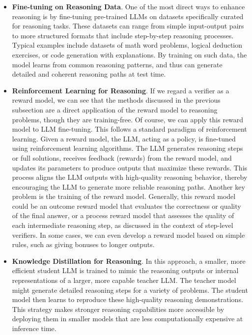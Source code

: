 \begin{itemize}
\item \vspace{0.5em} \textbf{Fine-tuning on Reasoning Data}. One of the most direct ways to enhance reasoning is by fine-tuning pre-trained LLMs on datasets specifically curated for reasoning tasks. These datasets can range from simple input-output pairs to more structured formats that include step-by-step reasoning processes. Typical examples include datasets of math word problems, logical deduction exercises, or code generation with explanations. By training on such data, the model learns from common reasoning patterns, and thus can generate detailed and coherent reasoning paths at test time.
\item \vspace{0.3em} \textbf{Reinforcement Learning for Reasoning}. If we regard a verifier as a reward model, we can see that the methods discussed in the previous subsection are a direct application of the reward model to reasoning problems, though they are training-free. Of course, we can apply this reward model to LLM fine-tuning. This follows a standard paradigm of reinforcement learning. Given a reward model, the LLM, acting as a policy, is fine-tuned using reinforcement learning algorithms. The LLM generates reasoning steps or full solutions, receives feedback (rewards) from the reward model, and updates its parameters to produce outputs that maximize these rewards. This process aligns the LLM outputs with high-quality reasoning behavior, thereby encouraging the LLM to generate more reliable reasoning paths. Another key problem is the training of the reward model. Generally, this reward model could be an outcome reward model that evaluates the correctness or quality of the final answer, or a process reward model that assesses the quality of each intermediate reasoning step, as discussed in the context of step-level verifiers. In some cases, we can even develop a reward model based on simple rules, such as giving bonuses to longer outputs.
\item \vspace{0.3em} \textbf{Knowledge Distillation for Reasoning}. In this approach, a smaller, more efficient student LLM is trained to mimic the reasoning outputs or internal representations of a larger, more capable teacher LLM. The teacher model might generate detailed reasoning steps for a variety of problems. The student model then learns to reproduce these high-quality reasoning demonstrations. This strategy makes stronger reasoning capabilities more accessible by deploying them in smaller models that are less computationally expensive at inference time.

\end{itemize}
